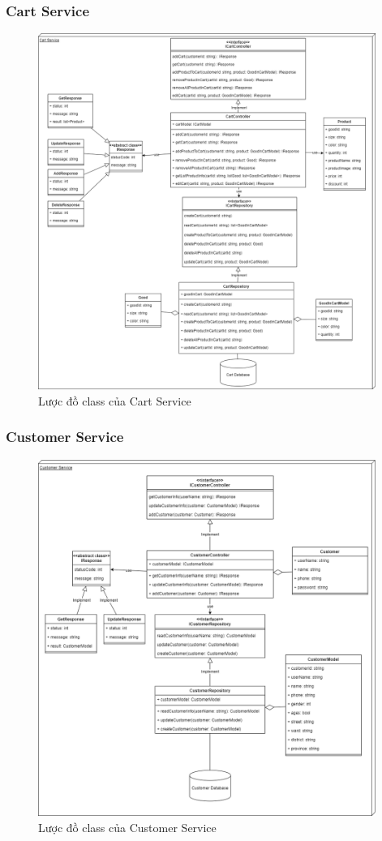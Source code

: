 \subsubsection{Cart Service}
\begin{figure}[!htp]
	\centering
	\includegraphics[width=11cm]{img/Architecture/service/CartService.png}
	\newline
	\caption{Lược đồ class của Cart Service}
\end{figure}


\subsubsection{Customer Service}
\begin{figure}[!htp]
	\centering
	\includegraphics[width=11cm]{img/Architecture/service/CustomerService.png}
	\newline
	\caption{Lược đồ class của Customer Service}
\end{figure}



